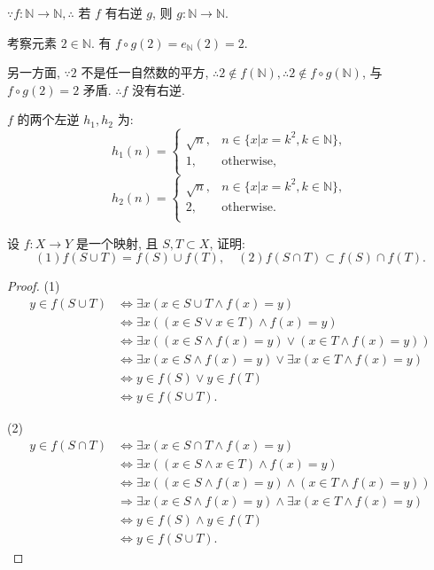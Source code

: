 \documentclass{ctexart}
\begin{document}
\begin{solution}
    $\because f:\mathbb{N}\to\mathbb{N},\therefore$ 若 $f$ 有右逆 $g$, 则 $g:\mathbb{N}\to\mathbb{N}$.

    考察元素 $2\in\mathbb{N}$. 有 $f\circ g(2)=e_{\mathbb{N}}(2)=2$.

    另一方面, $\because 2$ 不是任一自然数的平方, $\therefore2\notin f(\mathbb{N}),\therefore2\notin f\circ g(\mathbb{N})$, 与 $f\circ g(2)=2$ 矛盾. $\therefore f$ 没有右逆.

    $f$ 的两个左逆 $h_1,h_2$ 为:
    \[h_1(n)=\begin{cases}
        \sqrt{n}, & n\in\{x|x=k^2,k\in\mathbb{N}\}, \\
        1, & \text{otherwise}, \\
    \end{cases}\]
    \[h_2(n)=\begin{cases}
        \sqrt{n}, & n\in\{x|x=k^2,k\in\mathbb{N}\}, \\
        2, & \text{otherwise}. \\
    \end{cases}\]
\end{solution}
\begin{exercise}%
    设 $f:X\to Y$ 是一个映射, 且 $S,T\subset X$, 证明:
    \[(1)f(S\cup T)=f(S)\cup f(T),\quad(2)f(S\cap T)\subset f(S)\cap f(T).\]
\end{exercise}
\begin{proof}
    (1)
    \begin{align*}
        y\in f(S\cup T) & \Leftrightarrow\exists x(x\in S\cup T\land f(x)=y) \\
        & \Leftrightarrow\exists x((x\in S\vee x\in T)\land f(x)=y) \\
        & \Leftrightarrow\exists x((x\in S\land f(x)=y)\vee(x\in T\land f(x)=y)) \\
        & \Leftrightarrow\exists x(x\in S\land f(x)=y)\vee\exists x(x\in T\land f(x)=y) \\
        & \Leftrightarrow y\in f(S)\vee y\in f(T) \\
        & \Leftrightarrow y\in f(S\cup T).
    \end{align*}

    (2)
    \begin{align*}
        y\in f(S\cap T) & \Leftrightarrow\exists x(x\in S\cap T\land f(x)=y) \\
        & \Leftrightarrow\exists x((x\in S\land x\in T)\land f(x)=y) \\
        & \Leftrightarrow\exists x((x\in S\land f(x)=y)\land(x\in T\land f(x)=y)) \\
        & \Rightarrow\exists x(x\in S\land f(x)=y)\land\exists x(x\in T\land f(x)=y) \\
        & \Leftrightarrow y\in f(S)\land y\in f(T) \\
        & \Leftrightarrow y\in f(S\cup T).
    \end{align*}
\end{proof}
\end{document}
